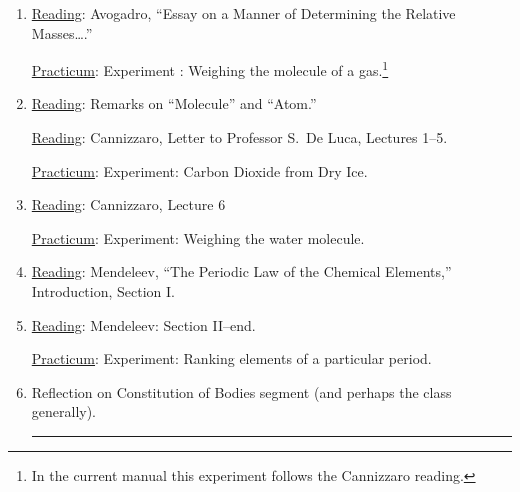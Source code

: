 \documentclass{article}
\newcommand{\rd}{\uline{Reading}}
\newcommand{\pc}{\uline{Practicum}}
\begin{document}
\begin{enumerate}
\pc: \label{definite}Experiment: Definite combining proportions.
	
\item \rd: Avogadro, ``Essay on a Manner of Determining the Relative Masses\dots.''  

	\pc: Experiment : Weighing the
molecule of a gas.\footnote{In the current manual this experiment follows the Cannizzaro reading.}

\item \rd: Remarks on ``Molecule'' and ``Atom.''

\rd: Cannizzaro, Letter to Professor S.\ De Luca, Lectures 1--5. 

\pc: Experiment: Carbon Dioxide from Dry Ice.

\item \rd: Cannizzaro, Lecture 6  

\pc: Experiment: Weighing the water molecule.

\item \rd: Mendeleev, ``The Periodic Law of the Chemical Elements,'' Introduction, Section I.

\item \rd: Mendeleev: Section II--end.  

	\pc: Experiment: Ranking elements of a particular period.
	
\item Reflection on Constitution of Bodies segment (and perhaps the class generally). \rule{1.2ex}{1.2ex}

\end{enumerate}


%
%
%
%
%
%
%
%
%
%
%
%
%
%
%
\end{document}
